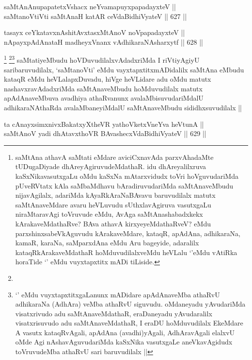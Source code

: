\begin{shl}
saMtAnAnupapatetxVshacx neYvamapuyxpapadayxteV || \\
saMtanoVtiVti saMtAnaH katAR ceVdaBidhiVyateV ||  627 ||  
\end{shl}
				
\begin{shl}
tasayx ceYkatavxnAshitAvxtasxMtAnoV noVpapadayxteV || \\
nApayxpAdAnataH madheyxVnanx vA\s dhikaraNAsharxytf ||  628 ||  
\end{shl}

\begin{artha}
\footnote{saMtAna athavA saMtati eMdare aviciCxnavAda parxvAhadaMte tUDugaDiyade dhAreyAgiruvudeMdathaR. idu dhAreyalilxruva kaSxNikavasutxgaLu oMdu kaSxNa mAtarxvidudx toVri hoVguvudariMda pUveRVtatx kAla saMbaMdhavu bAradiruvudariMda saMtAnaveMbudu nijavAgilalx, adariMda kAyaRkAraNaBAvavu baruvudilalx matutx saMtAnaveMdare avaru heVLuvudu sUthxlavAgiruva vasutxgaLu niraMtaravAgi toVruvude eMdu, AvAga saMtAnashabadxkekx kArakaveMdathaRve? BAva athavA kirxyeyeMdathaRveV? eMdu parxshinxsabeVkAguvudu kArakaveMdare, kataqR, apAdAna, adhikaraNa, kamaR, karaNa, saMparxdAna eMdu Aru bageyide, adaralilx kataqRkArakaveMdathaR hoMduvudilalxveMdu heVLalu `\stext'eMdu vAtiRka horaTide `\stext' eMdu vuyxtapxtitx mADi tiLiside.}
\footnote{}\footnote{`\stext' eMdu vuyxtapxtitxgaLanunx mADidare apAdAnaveMba athaRvU adhikaraNa (AdhAra) veMba athaRvU siguvudu. oMdaneyadu yAvudariMda visatxrivudo adu saMtAnaveMdathaR, eraDaneyadu yAvudaralilx visatxrisuvudo adu saMtAnaveMdathaR, I eraDU hoMduvudilalx EkeMdare A vasutx kataqRvAgali, apAdAna (avadhi)yAgali, AdhAravAgali elalxvU oMde Agi nAshavAguvudariMda kaSxNika vasutxgaLe aneVkavAgidudx toVruvudeMba athaRvU sari baruvudilalx ||}
saMtatiyeMbudu hoVDuvudilalxvAdadxriMda I riVtiyAgiyU saribaruvudilalx, `saMtanoVti' eMdu vayxtapxtitxmADidalilx saMtAna eMbudu kataqR eMdu heVLalapxDuvadu, hiVge heVLidare adu oMdu matutx nashavxravAdadxriMda saMtAnaveMbudu hoMduvudilalx matutx apAdAnaveMbuva avadhiya athaRvanunx avalaMbisuvudariMdalU adhikaraNAthaRda avalaMbaneyiMdalU saMtAnaveMbudu sididhxsuvudilalx ||
\end{artha}


\begin{shl}
ta cAnayxsimxnivxBakatxyXtheVR yathoVketxVneYva heVtunA ||  \\
saMtAnoV yadi dhAtavxthoVR BAvashecxVdaBidhiVyateV ||  629 ||  
\end{shl}

